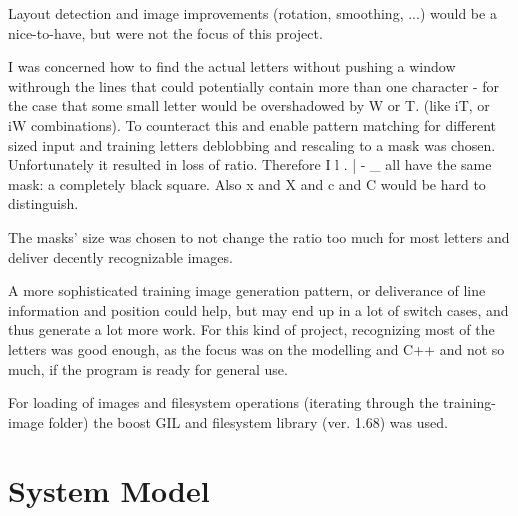 \documentclass[12pt]{scrartcl}
\begin{document}
Layout detection and image improvements (rotation, smoothing, ...) would be a nice-to-have, but were not the focus of this project.

I was concerned how to find the actual letters without pushing a window withrough the lines that could potentially contain more than one character - for the case that some small letter would be overshadowed by W or T. (like iT, or iW combinations). To counteract this and enable pattern matching for different sized input and training letters deblobbing and rescaling to a mask was chosen.
Unfortunately it resulted in loss of ratio. Therefore I l . | - \_ all have the same mask: a completely black square. Also x and X and c and C would be hard to distinguish.\newline

The masks' size was chosen to not change the ratio too much for most letters and deliver decently recognizable images. 

A more sophisticated training image generation pattern, or deliverance of line information and position could help, but may end up in a lot of switch cases, and thus generate a lot more work. For this kind of project, recognizing most of the letters was good enough, as the focus was on the modelling and C++ and not so much, if the program is ready for general use.

For loading of images and filesystem operations (iterating through the training-image folder) the boost GIL and filesystem library (ver. 1.68) was used.


\section {System Model}
\end{document}
